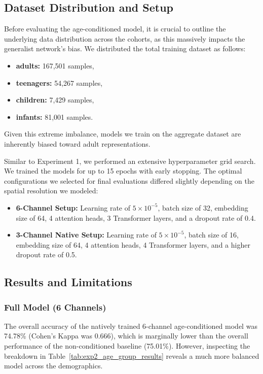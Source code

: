 \subsection{Dataset Distribution and Setup}
Before evaluating the age-conditioned model, it is crucial to outline the underlying data distribution across the cohorts, as this massively impacts the generalist network's bias. We distributed the total training dataset as follows:
\begin{itemize}
    \item \textbf{adults:} 167,501 samples,
    \item \textbf{teenagers:} 54,267 samples,
    \item \textbf{children:} 7,429 samples,
    \item \textbf{infants:} 81,001 samples.
\end{itemize}
Given this extreme imbalance, models we train on the aggregate dataset are inherently biased toward adult representations. 

Similar to Experiment 1, we performed an extensive hyperparameter grid search. We trained the models for up to 15 epochs with early stopping. The optimal configurations we selected for final evaluations differed slightly depending on the spatial resolution we modeled:
\begin{itemize}
    \item \textbf{6-Channel Setup:} Learning rate of $5 \times 10^{-5}$, batch size of 32, embedding size of 64, 4 attention heads, 3 Transformer layers, and a dropout rate of 0.4.
    \item \textbf{3-Channel Native Setup:} Learning rate of $5 \times 10^{-5}$, batch size of 16, embedding size of 64, 4 attention heads, 4 Transformer layers, and a higher dropout rate of 0.5.
\end{itemize}

\subsection{Results and Limitations}

\subsubsection*{Full Model (6 Channels)}
The overall accuracy of the natively trained 6-channel age-conditioned model was 74.78\% (Cohen's Kappa was 0.666), which is marginally lower than the overall performance of the non-conditioned baseline (75.01\%). However, inspecting the breakdown in Table~\ref{tab:exp2_age_group_results} reveals a much more balanced model across the demographics. 

